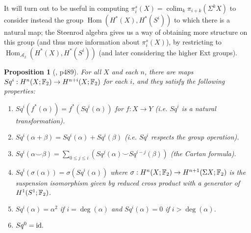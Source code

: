 \documentclass[11pt, titlepage]{article} %
\def\bb{\ensuremath\mathbb}
\def\inte{\ensuremath\mathbb{Z}}
\def\A{\ensuremath{\mathscr{A}_2}}
\def\id{\ensuremath\text{id}}
\def\wildetilde{\ensuremath\widetilde}
\DeclareMathOperator{\colim}{colim}
\DeclareMathOperator{\Hom}{Hom}
\numberwithin{equation}{subsection}
\theoremstyle{plain}
\newtheorem{proposition}[theorem]{Proposition}
\theoremstyle{definition}
\begin{document}
It will turn out to be useful in computing \(\pi_i^s(X)=\colim_k \pi_{i+k}(\Sigma^k X)\) to consider instead the group \(\Hom(H^*(X), H^*(S^i))\) to which there is a natural map; the Steenrod algebra gives us a way of obtaining more structure on this group (and thus more information about \(\pi_i^s(X)\)), by restricting to \(\Hom_{\A}(H^*(X), H^*(S^i))\) (and later considering the higher Ext groups).  

\begin{proposition}[{\autocite{hatcher}, p489}]\label{2504201153}
For all \(X\) and each \(n\), there are maps \(Sq^i : H^n(X; \bb{F}_2)\to H^{n+i}(X; \bb{F}_2)\) for each \(i\), and they satisfy the following properties: \begin{enumerate}
\item \(Sq^i(f^*(\alpha))=f^*(Sq^i(\alpha))\) for \(f : X \to Y\) (i.e. \(Sq^i\) is a natural transformation).
\item \(Sq^i(\alpha + \beta)=Sq^i(\alpha)+Sq^i(\beta)\) (i.e. \(Sq^i\) respects the group operation).
\item \(Sq^i(\alpha \smile \beta)=\sum\limits_{0\leq j \leq i} (Sq^j(\alpha)\smile Sq^{i-j}(\beta))\) (the Cartan formula).
\item \(Sq^i(\sigma(\alpha))=\sigma(Sq^i(\alpha))\) where \(\sigma : H^n(X; \bb{F}_2)\to H^{n+1}(\Sigma X; \bb{F}_2)\) is the suspension isomorphism given by reduced cross product with a generator of \(H^1(S^1; \bb{F}_2)\).%
\item \(Sq^i(\alpha)=\alpha^2\) if \(i=\deg(\alpha)\) and \(Sq^i(\alpha)=0\) if \(i> \deg(\alpha)\). 
\item \(Sq^0=\id.\)
\end{enumerate}
\end{proposition}
\end{document}
